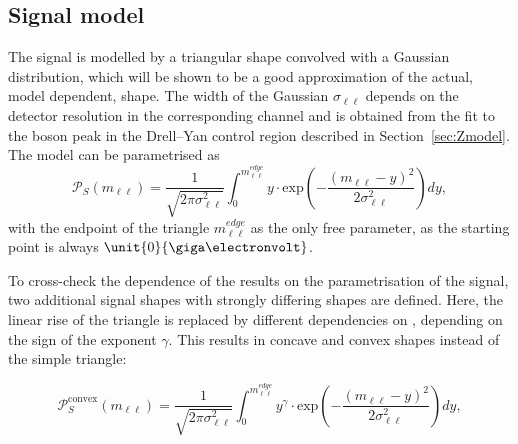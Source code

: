 \subsection{Signal model}
\label{sec:sigModel}
The signal is modelled by a triangular shape convolved with a Gaussian distribution, which will be shown to be a good approximation of the actual, model dependent, shape. The width of the Gaussian $\sigma_{\ell\ell}$ depends on the detector resolution in the corresponding channel and is obtained from the fit to the \Z boson peak in the Drell--Yan control region described in Section~\ref{sec:Zmodel}. The model can be parametrised as
\begin{equation*}
 {\mathcal{P}}_{S}(m_{\ell\ell}) = \frac{1}{\sqrt{2\pi\sigma_{\ell\ell}^2}} \int_{0}^{m_{\ell\ell}^{edge}} y \cdot \textrm{exp}\left( -\frac{(m_{\ell\ell}-y)^2}{2\sigma_{\ell\ell}^{2}}\right) dy,
\end{equation*}
with the endpoint of the triangle $m_{\ell\ell}^{edge}$ as the only free parameter, as the starting point is always $\unit{0}{\giga\electronvolt}$.

To cross-check the dependence of the results on the parametrisation of the signal, two additional signal shapes with strongly differing shapes are defined. Here, the linear rise of the triangle is replaced by different dependencies on \mll, depending on the sign of the exponent $\gamma$. This results in concave and convex shapes instead of the simple triangle:

\begin{equation}
\label{eq:convex}
 {\mathcal{P}}^{\text{convex}}_{S}(m_{\ell\ell}) = \frac{1}{\sqrt{2\pi\sigma_{\ell\ell}^2}} \int_{0}^{m_{\ell\ell}^{edge}} y^{\gamma} \cdot \textrm{exp}\left( -\frac{(m_{\ell\ell}-y)^2}{2\sigma_{\ell\ell}^{2}}\right) dy,
\end{equation}

